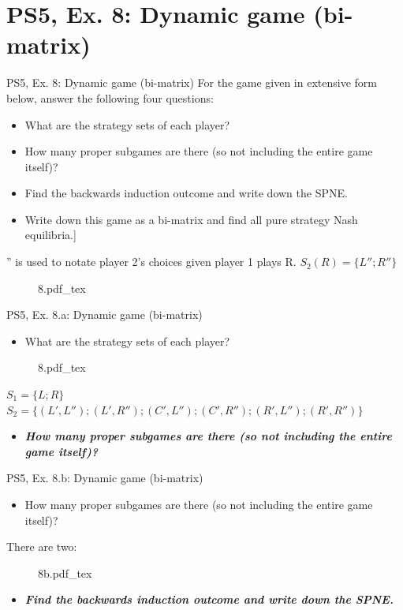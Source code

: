 \section{PS5, Ex. 8: Dynamic game (bi-matrix)}

\begin{frame}{PS5, Ex. 8: Dynamic game (bi-matrix)}
  For the game given in extensive form below, answer the following four questions:
  \begin{itemize}
    \item[(a)] What are the strategy sets of each player?
    \item[(b)] How many proper subgames are there (so not including the entire game itself)?
    \item[(c)] Find the backwards induction outcome and write down the SPNE.
    \item[(d)] Write down this game as a bi-matrix and find all pure strategy Nash equilibria.]
  \end{itemize}
    '' is used to notate player 2’s choices given player 1 plays R. $S_2(R)=\{L'';R''\}$
  \begin{figure}[!h]
    \center
    \def\svgwidth{.8\columnwidth}
    {8.pdf_tex}
  \end{figure}
  \vfill\null
\end{frame}

\begin{frame}{PS5, Ex. 8.a: Dynamic game (bi-matrix)}
  \begin{itemize}
    \item[(a)] What are the strategy sets of each player?
  \end{itemize}
  \begin{figure}[!h]
    \center
    \def\svgwidth{.8\columnwidth}
    {8.pdf_tex}
  \end{figure}
  $S_1=\{L;R\}$\\
  $S_2=\{(L',L'');(L', R'');(C',L'');(C', R'');(R',L'');(R', R'')\}$
  \begin{itemize}
    \item[(b)] \textbf{\textit{How many proper subgames are there (so not including the entire game itself)?}}
  \end{itemize}
  \vfill\null
\end{frame}

\begin{frame}{PS5, Ex. 8.b: Dynamic game (bi-matrix)}
  \begin{itemize}
    \item[(b)] How many proper subgames are there (so not including the entire game itself)?
  \end{itemize}
  There are two:
  \begin{figure}[!h]
    \center
    \def\svgwidth{.9\columnwidth}
    {8b.pdf_tex}
  \end{figure}
  \begin{itemize}
    \item[(C)] \textbf{\textit{Find the backwards induction outcome and write down the SPNE.}}
  \end{itemize}
  \vfill\null
\end{frame}

